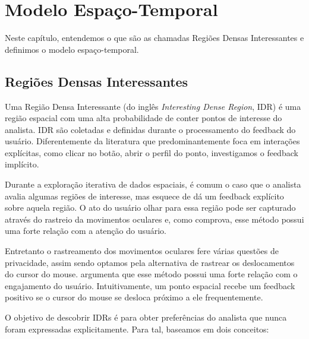 \chapter{Modelo Espaço-Temporal}
\label{chap:modelo}



Neste capítulo, entendemos o que são as chamadas Regiões Densas Interessantes e definimos o modelo espaço-temporal.

\section{Regiões Densas Interessantes}


Uma Região Densa Interessante (do inglês {\em Interesting Dense Region}, IDR) é uma região espacial com uma alta probabilidade de conter pontos de interesse do analista. IDR são coletadas e definidas durante o processamento do feedback do usuário. Diferentemente da literatura que predominantemente foca em interações explícitas, como clicar no botão, abrir o perfil do ponto, investigamos o feedback implícito.

Durante a exploração iterativa de dados espaciais, é comum o caso que o analista avalia algumas regiões de interesse, mas esquece de dá um feedback explícito sobre aquela região. O ato do usuário olhar para essa região pode ser capturado através do rastreio da movimentos oculares e, como  comprova, esse método possui uma forte relação com a atenção do usuário.

Entretanto o rastreamento dos movimentos oculares fere várias questões de privacidade, assim sendo optamos pela alternativa de rastrear os deslocamentos do cursor do mouse.  argumenta que esse método possui uma forte relação com o engajamento do usuário. Intuitivamente, um ponto espacial recebe um feedback positivo se o cursor do mouse se desloca próximo a ele frequentemente.

O objetivo de descobrir IDRs é para obter preferências do analista que nunca foram expressadas explicitamente. Para tal, baseamos em dois conceitos:

